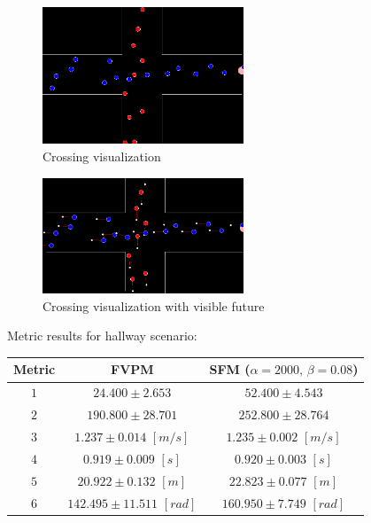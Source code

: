 \documentclass[english]{article}
\providecommand{\tabularnewline}{\\}
\begin{document}
\vspace{1cm}

\begin{figure}[h]
    \begin{centering}
    \includegraphics[width=6cm]{pics/program/crossing-no-future} 
    \par\end{centering}
    \caption{\label{fig:crossing-no-future}Crossing visualization}
\end{figure}


\begin{figure}[h]
    \centering{} \includegraphics[width=6cm]{pics/program/crossing-future}
    \caption{\label{fig:crossing-future}Crossing visualization with visible future}
\end{figure}

Metric results for hallway scenario:

\begin{tabular}{|c|c|c|}
    \hline 
    Metric  & {\scriptsize{FVPM}} & {\scriptsize{SFM ($\alpha=2000,\,\beta=0.08$)}}\tabularnewline
    \hline 
    \hline 
    $1$  & {\scriptsize{$24.400\pm2.653$}} & {\scriptsize{$52.400\pm4.543$}}\tabularnewline
    \hline 
    $2$  & {\scriptsize{$190.800\pm28.701$}} & {\scriptsize{$252.800\pm28.764$}}\tabularnewline
    \hline 
    $3$  & {\scriptsize{$1.237\pm0.014$ $[m/s]$}} & {\scriptsize{$1.235\pm0.002$ $[m/s]$}}\tabularnewline
    \hline 
    $4$  & {\scriptsize{$0.919\pm0.009$ $[s]$}} & {\scriptsize{$0.920\pm0.003$ $[s]$}}\tabularnewline
    \hline 
    $5$  & {\scriptsize{$20.922\pm0.132$ $[m]$}} & {\scriptsize{$22.823\pm0.077$ $[m]$}}\tabularnewline
    \hline 
    $6$  & {\scriptsize{$142.495\pm11.511$ $[rad]$}} & {\scriptsize{$160.950\pm7.749$ $[rad]$}}\tabularnewline
    \hline 
\end{tabular}
\end{document}
